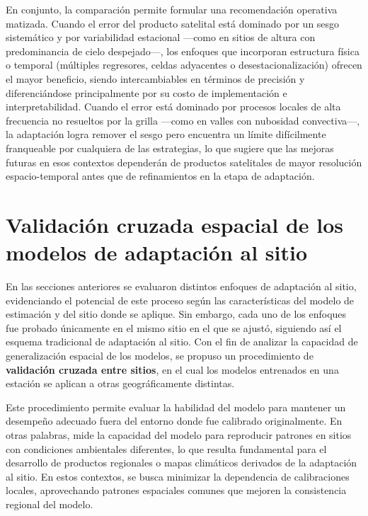 En conjunto, la comparación permite formular una recomendación operativa matizada. Cuando el error del producto satelital está dominado por un sesgo sistemático y por variabilidad estacional —como en sitios de altura con predominancia de cielo despejado—, los enfoques que incorporan estructura física o temporal (múltiples regresores, celdas adyacentes o desestacionalización) ofrecen el mayor beneficio, siendo intercambiables en términos de precisión y diferenciándose principalmente por su costo de implementación e interpretabilidad. Cuando el error está dominado por procesos locales de alta frecuencia no resueltos por la grilla —como en valles con nubosidad convectiva—, la adaptación logra remover el sesgo pero encuentra un límite difícilmente franqueable por cualquiera de las estrategias, lo que sugiere que las mejoras futuras en esos contextos dependerán de productos satelitales de mayor resolución espacio-temporal antes que de refinamientos en la etapa de adaptación.

\section{Validación cruzada espacial de los modelos de adaptación al sitio}

En las secciones anteriores se evaluaron distintos enfoques de adaptación al sitio, evidenciando el potencial de este proceso según las características del modelo de estimación y del sitio donde se aplique. Sin embargo, cada uno de los enfoques fue probado únicamente en el mismo sitio en el que se ajustó, siguiendo así el esquema tradicional de adaptación al sitio. Con el fin de analizar la capacidad de generalización espacial de los modelos, se propuso un procedimiento de \textbf{validación cruzada entre sitios}, en el cual los modelos entrenados en una estación se aplican a otras geográficamente distintas.

Este procedimiento permite evaluar la habilidad del modelo para mantener un desempeño adecuado fuera del entorno donde fue calibrado originalmente. En otras palabras, mide la capacidad del modelo para reproducir patrones en sitios con condiciones ambientales diferentes, lo que resulta fundamental para el desarrollo de productos regionales o mapas climáticos derivados de la adaptación al sitio. En estos contextos, se busca minimizar la dependencia de calibraciones locales, aprovechando patrones espaciales comunes que mejoren la consistencia regional del modelo.

